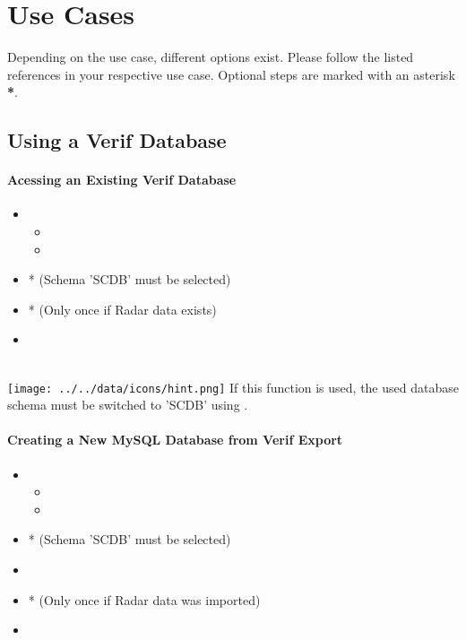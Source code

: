 \section{Use Cases}

Depending on the use case, different options exist. Please follow the listed references in your respective use case. Optional steps are marked with an asterisk \textbf{*}.

\subsection{Using a Verif Database}

\paragraph{Acessing an Existing Verif Database}

\begin{itemize}
\item {}
\begin{itemize}
 \item {}
 \item {}
 \end{itemize}
 \item {}* (Schema 'SCDB' must be selected)
 \item {}* (Only once if Radar data exists)
 \item {}
\end{itemize}
\ \\

\texttt{[image: ../../data/icons/hint.png]} If this function is used, the used database schema must be switched to 'SCDB' using . \\

\paragraph{Creating a New MySQL Database from Verif Export}

\begin{itemize}
\item {}
\begin{itemize}
 \item {}
 \item {}
 \end{itemize}
 \item {}* (Schema 'SCDB' must be selected)
 \item {}
 \item {}* (Only once if Radar data was imported)
 \item {}
\end{itemize}
\ \\

